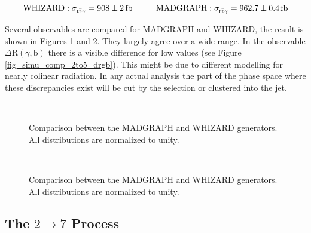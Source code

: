 \begin{equation}
\mathrm{WHIZARD: }\; \sigma_{\ttgamma} = \SI{908 \pm 2}{\femto \barn} \hspace{1.cm} \mathrm{MADGRAPH: }\; \sigma_{\ttgamma} = \SI{962.7 \pm 0.4}{\femto \barn}
\label{eq_simu_2to5_cross}
\end{equation}

Several observables are compared for MADGRAPH and WHIZARD, the result is shown in Figures \ref{fig_simu_comp_2to5_1} and \ref{fig_simu_comp_2to5_2}. They largely agree over a wide range. In the observable $\Delta \mathrm{R} (\gamma,\mathrm{b})$ there is a visible difference for low values (see Figure \ref{fig_simu_comp_2to5_drgb}). This might be due to different modelling for nearly colinear radiation. In any actual analysis the part of the phase space where these discrepancies exist will be cut by the selection or clustered into the jet.

\begin{figure}
  \\
  \caption{Comparison between the MADGRAPH and WHIZARD generators. All distributions are normalized to unity.}
  \label{fig_simu_comp_2to5_1}
\end{figure}

\begin{figure}
  \\
  \caption{Comparison between the MADGRAPH and WHIZARD generators. All distributions are normalized to unity.}
  \label{fig_simu_comp_2to5_2}
\end{figure}

\subsection{The $2 \to 7$ Process}

